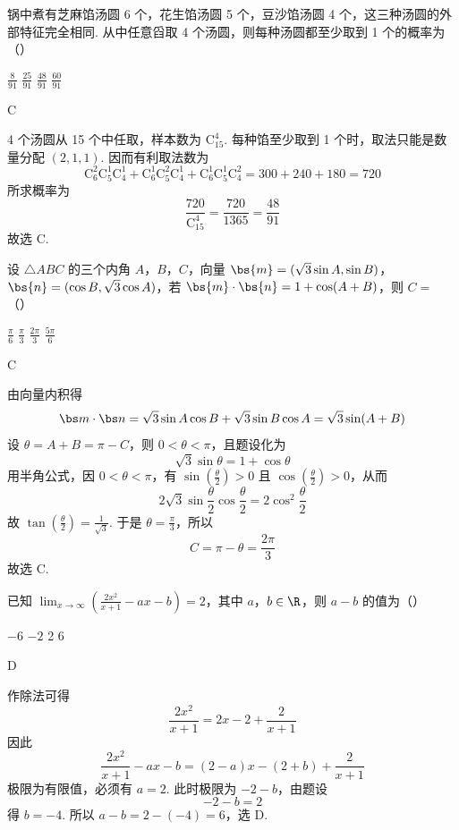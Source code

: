 \begin{problem}
锅中煮有芝麻馅汤圆 6 个，花生馅汤圆 5 个，豆沙馅汤圆 4 个，这三种汤圆的外部特征完全相同. 从中任意舀取 4 个汤圆，则每种汤圆都至少取到 1 个的概率为（\quad）

\choices
    {\(\frac{8}{91}\)}
    {\(\frac{25}{91}\)}
    {\(\frac{48}{91}\)}
    {\(\frac{60}{91}\)}

\begin{answer}
C
\end{answer}

\begin{solution}
4 个汤圆从 15 个中任取，样本数为 \(\mathrm C_{15}^{4}\). 每种馅至少取到 1 个时，取法只能是数量分配 \((2,1,1)\). 因而有利取法数为
\[
 \mathrm C_{6}^{2}\mathrm C_{5}^{1}\mathrm C_{4}^{1}
 +\mathrm C_{6}^{1}\mathrm C_{5}^{2}\mathrm C_{4}^{1}
 +\mathrm C_{6}^{1}\mathrm C_{5}^{1}\mathrm C_{4}^{2}
 =300+240+180=720
\]
所求概率为
\[
\frac{720}{\mathrm C_{15}^{4}}=\frac{720}{1365}=\frac{48}{91}
\]
故选 C.
\end{solution}
\end{problem}

\begin{problem}
设 \(\triangle ABC\) 的三个内角 \(A\)，\(B\)，\(C\)，向量 \(\bs{m} = (\sqrt{3} \sin A, \sin B)\)，\(\bs{n} = (\cos B, \sqrt{3} \cos A)\)，若 \(\bs{m} \cdot \bs{n} = 1 + \cos (A + B)\)，则 \(C =\)（\quad）

\choices
    {\(\frac{\pi}{6}\)}
    {\(\frac{\pi}{3}\)}
    {\(\frac{2\pi}{3}\)}
    {\(\frac{5\pi}{6}\)}

\begin{answer}
C
\end{answer}

\begin{solution}
由向量内积得
\[
\bs m\cdot\bs n
=\sqrt{3}\sin A\cos B+\sqrt{3}\sin B\cos A
=\sqrt{3}\sin(A+B)
\]
设 \(\theta=A+B=\pi-C\)，则 \(0<\theta<\pi\)，且题设化为
\[
\sqrt{3}\sin\theta=1+\cos\theta
\]
用半角公式，因 \(0<\theta<\pi\)，有 \(\sin(\frac{\theta}{2})>0\) 且 \(\cos(\frac{\theta}{2})>0\)，从而
\[
2\sqrt{3}\sin\frac\theta2\cos\frac\theta2
=2\cos^{2}\frac\theta2
\]
故 \(\tan(\frac{\theta}{2})=\frac{1}{\sqrt{3}}\). 于是 \(\theta=\frac{\pi}{3}\)，所以
\[
C=\pi-\theta=\frac{2\pi}{3}
\]
故选 C.
\end{solution}
\end{problem}

\begin{problem}
已知 \(\displaystyle\lim_{x\to\infty}\left(\frac{2x^2}{x + 1} -ax - b\right) = 2\)，其中 \(a\)，\(b\in \R\)，则 \(a - b\) 的值为（\quad）

\choices
    {\(-6\)}
    {\(-2\)}
    {2}
    {6}

\begin{answer}
D
\end{answer}

\begin{solution}
作除法可得
\[
\frac{2x^{2}}{x+1}=2x-2+\frac{2}{x+1}
\]
因此
\[
\frac{2x^{2}}{x+1}-ax-b
=(2-a)x-(2+b)+\frac{2}{x+1}
\]
极限为有限值，必须有 \(a=2\). 此时极限为 \(-2-b\)，由题设
\[
-2-b=2
\]
得 \(b=-4\). 所以 \(a-b=2-(-4)=6\)，选 D.
\end{solution}
\end{problem}

